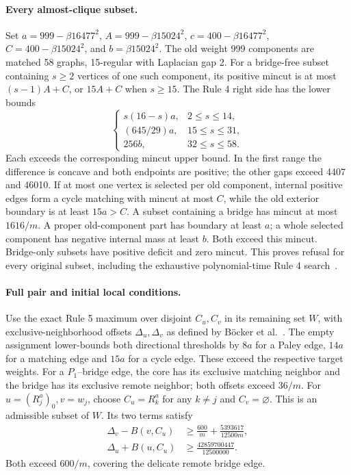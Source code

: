 \documentclass[sigconf,anonymous,review]{acmart}
\newcommand{\1}{\mathbf{1}}
\begin{document}
\paragraph{Every almost-clique subset.}
Set $a=999-\beta16477^2$, $A=999-\beta15024^2$,
$c=400-\beta16477^2$, $C=400-\beta15024^2$, and $b=\beta15024^2$.
The old weight 999 components are matched 58 graphs, 15-regular with
Laplacian gap 2. For a bridge-free subset containing $s\ge2$ vertices
of one such component, its positive mincut is at most $(s-1)A+C$,
or $15A+C$ when $s\ge15$. The Rule 4 right side has the lower bounds
\[
 \begin{cases}
 s(16-s)a,&2\le s\le 14,\\
 (645/29)a,&15\le s\le 31,\\
 256b,&32\le s\le 58.
 \end{cases}
\]
Each exceeds the corresponding mincut upper bound. In the first range
the difference is concave and both endpoints are positive; the other
gaps exceed 4407 and 46010. If at most one vertex is selected per old
component, internal positive edges form a cycle matching with mincut
at most $C$, while the old exterior boundary is at least $15a>C$.
A subset containing a bridge has mincut at most $1616/m$.
A proper old-component part has boundary at least $a$; a whole selected
component has negative internal mass at least $b$. Both exceed this
mincut. Bridge-only subsets have positive deficit and zero mincut.
This proves refusal for every original subset, including the exhaustive
polynomial-time Rule 4 search~\cite{schulz2022cut}.

\paragraph{Full pair and initial local conditions.}
Use the exact Rule 5 maximum over disjoint $C_u,C_v$ in its remaining
set $W$, with exclusive-neighborhood offsets $\Delta_u,\Delta_v$
as defined by B\"ocker et al.~\cite{bocker2011exact}.
The empty assignment lower-bounds both directional thresholds by $8a$
for a Paley edge, $14a$ for a matching edge and $15a$ for a cycle edge.
These exceed the respective target weights. For a $P_1$--bridge edge,
the core has its exclusive matching neighbor and the bridge has its
exclusive remote neighbor; both offsets exceed $36/m$.
For $u=(R_j^a)_0,v=w_j$, choose $C_u=R_k^a$ for any $k\ne j$ and
$C_v=\varnothing$. This is an admissible subset of $W$. Its two terms satisfy
\[
 \begin{aligned}
 \Delta_v-B(v,C_u)&\ge
 \frac{600}{m}+\frac{5393617}{12500m},\\
 \Delta_u+B(u,C_u)&\ge\frac{42859700447}{12500000}.
 \end{aligned}
\]
Both exceed $600/m$, covering the delicate remote bridge edge.
\end{document}
